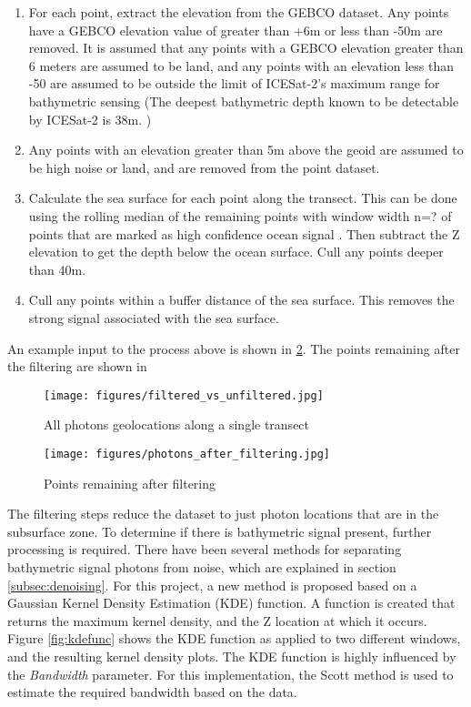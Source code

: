 \begin{enumerate}
    \item For each point, extract the elevation from the GEBCO dataset. Any points have a GEBCO elevation value of greater than +6m or less than -50m are removed. It is assumed that any points with a GEBCO elevation greater than 6 meters are assumed to be land, and any points with an elevation less than -50 are assumed to be outside the limit of ICESat-2's maximum range for bathymetric sensing (The deepest bathymetric depth known to be detectable by ICESat-2 is 38m. \parencite{Parrish2019})
    
    \item Any points with an elevation greater than 5m above the geoid are assumed to be high noise or land, and are removed from the point dataset.

    \item Calculate the sea surface for each point along the transect. This can be done using the rolling median of the remaining points with window width n=? of points that are marked as high confidence ocean signal \parencite{Ranndal2021}. Then subtract the Z elevation to get the depth below the ocean surface.  Cull any points deeper than 40m. 
    \item Cull any points within a buffer distance of the sea surface. This removes the strong signal associated with the sea surface.
\end{enumerate}

An example input to the process above is shown in \ref{fig:filtering_results}. The points remaining after the filtering are shown in 

\begin{figure}[h!]
    \centering
    \texttt{[image: figures/filtered\_vs\_unfiltered.jpg]}
    \caption{All photons geolocations along a single transect}
    \label{fig:filtering_results}
\end{figure}

\begin{figure}[h!]
    \centering
    \texttt{[image: figures/photons\_after\_filtering.jpg]}
    \caption{Points remaining after filtering}
    \label{fig:filtering_results}
\end{figure}

The filtering steps reduce the dataset to just photon locations that are in the subsurface zone. To determine if there is bathymetric signal present, further processing is required. There have been several methods for separating bathymetric signal photons from noise, which are explained in section \ref{subsec:denoising}. For this project, a new method is proposed based on a Gaussian Kernel Density Estimation (KDE) function. A function is created that returns the maximum kernel density, and the Z location at which it occurs. Figure \ref{fig:kdefunc} shows the KDE function as applied to two different windows, and the resulting kernel density plots. The KDE function is highly influenced by the \emph{Bandwidth} parameter. For this implementation, the Scott method \parencite{Scott2015} is used to estimate the required bandwidth based on the data. 

